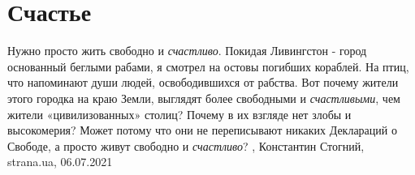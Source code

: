  
 
 
 
 
\chapter{Счастье}

Нужно просто жить свободно и \emph{счастливо}.  Покидая Ливингстон - город основанный
беглыми рабами, я смотрел на остовы погибших кораблей. На птиц, что напоминают
души людей, освободившихся от рабства.  Вот почему жители этого городка на краю
Земли, выглядят более свободными и \emph{счастливыми}, чем жители «цивилизованных»
столиц? Почему в их взгляде нет злобы и высокомерия? Может потому что они не
переписывают никаких Деклараций о Свободе, а просто живут свободно и \emph{счастливо}?
, 
Константин Стогний, strana.ua, 06.07.2021

